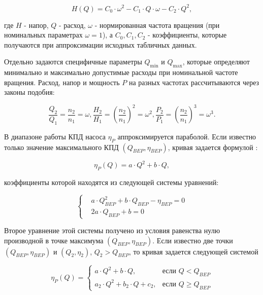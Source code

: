 \documentclass[a4paper, 12pt]{article}
\begin{document}
\begin{equation}\label{eq:HQ_curve}
	H(Q) = C_0 \cdot \omega^2 - C_1 \cdot Q \cdot \omega - C_2 \cdot Q^2,
\end{equation}

\noindent где $H$ - напор, $Q$ - расход, $\omega$ - нормированная частота вращения
(при номинальных параметрах $\omega = 1$), а $C_0, C_1, C_2$ - коэффициенты, которые
получаются при аппроксимации исходных табличных данных.

Отдельно задаются специфичные параметры \(Q_{\min}\) и \(Q_{\max}\),
которые определяют минимально и максимально допустимые расходы при
номинальной частоте вращения. Расход, напор и мощность $P$ на разных
частотах рассчитываются через законы подобия:

\begin{equation}\label{eq:affinity}
	\frac{Q_2}{Q_1} = \frac{n_2}{n_1} = \omega, \frac{H_2}{H_1} = \left(\frac{n_2}{n_1}\right)^2 = \omega^2, \frac{P_2}{P_1} = \left(\frac{n_2}{n_1}\right)^3 = \omega^3.
\end{equation}

В диапазоне работы КПД насоса $\eta_P$ аппроксимируется параболой. Если известно только
значение максимального КПД \((Q_{BEP}, \eta_{BEP})\), кривая задается
формулой \cite{Chantasiriwan}:

\begin{equation}
	\eta_P(Q) = a \cdot Q^2 + b \cdot Q,
\end{equation}

\noindent коэффициенты которой находятся из следующей системы уравнений:

\begin{equation}
\label{eq:eff_bep}
	\left\{
    \begin{aligned}
        &a \cdot Q^2_{BEP} + b \cdot Q_{BEP} - \eta_{BEP} = 0 \\
        &2a \cdot Q_{BEP} + b = 0
    \end{aligned}
	\right.
\end{equation}

\noindent Второе уравнение этой системы получено из условия равенства нулю производной в точке
максимума \((Q_{BEP}, \eta_{BEP})\). Если известно две точки \((Q_{BEP}, \eta_{BEP})\) и \((Q_2, \eta_2)\),
\(Q_2 > Q_{BEP}\), то кривая задается следующей системой

\begin{equation}
	\eta_P(Q) = 
    \begin{cases}
        a \cdot Q^2 + b \cdot Q, &\text{если }  Q < Q_{BEP} \\
        a_2 \cdot Q^2 + b_2 \cdot Q + c_2, &\text{если }  Q \ge Q_{BEP}
    \end{cases}
\end{equation}
\end{document}
